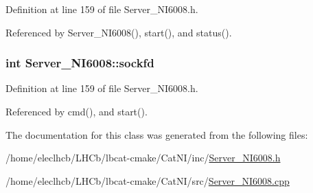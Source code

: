 Definition at line 159 of file Server\_\-NI6008.h.

Referenced by Server\_\-NI6008(), start(), and status().\hypertarget{classServer__NI6008_a79b2fe632095d34e1c6320a1ffe2d561}{
\subsubsection[{sockfd}]{\setlength{\rightskip}{0pt plus 5cm}int {\bf Server\_\-NI6008::sockfd}}}
\label{classServer__NI6008_a79b2fe632095d34e1c6320a1ffe2d561}


Definition at line 159 of file Server\_\-NI6008.h.

Referenced by cmd(), and start().

The documentation for this class was generated from the following files:\begin{DoxyCompactItemize}
\item 
/home/eleclhcb/LHCb/lbcat-\/cmake/CatNI/inc/\hyperlink{Server__NI6008_8h}{Server\_\-NI6008.h}\item 
/home/eleclhcb/LHCb/lbcat-\/cmake/CatNI/src/\hyperlink{Server__NI6008_8cpp}{Server\_\-NI6008.cpp}\end{DoxyCompactItemize}
